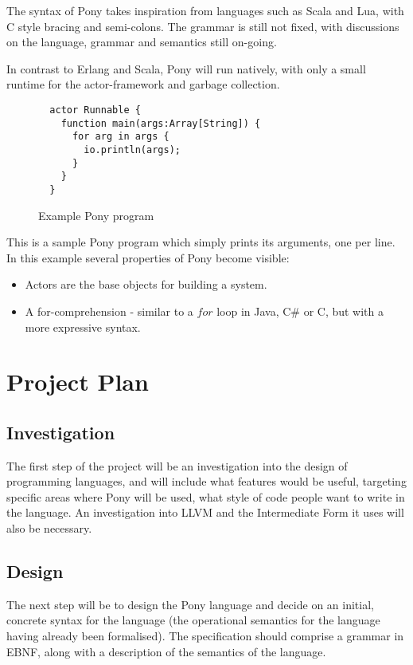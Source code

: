 \documentclass{article}
\begin{document}
The syntax of Pony takes inspiration from languages such as Scala and Lua, with
C style bracing and semi-colons. The grammar is still not fixed, with
discussions on the language, grammar and semantics still on-going.

In contrast to Erlang and Scala, Pony will run natively, with only a small runtime
for the actor-framework and garbage collection.

\begin{figure}[H]
\begin{verbatim}
  actor Runnable {
    function main(args:Array[String]) {
      for arg in args {
      	io.println(args);
      }
    }
  }
\end{verbatim}
\caption{Example Pony program}
\label{fig:simple}
\end{figure}

This is a sample Pony program which simply prints its arguments, one per line.
In this example several properties of Pony become visible:
\begin{itemize}
\item Actors are the base objects for building a system.
\item A for-comprehension - similar to a $for$ loop in Java, C\# or C, but with
      a more expressive syntax.
\end{itemize}

\section{Project Plan}

\subsection{Investigation}
The first step of the project will be an investigation into the design of
programming languages, and will include what features would be useful, targeting
specific areas where Pony will be used, what style of code people want to write
in the language. An investigation into LLVM and the Intermediate Form it uses
will also be necessary.

\subsection{Design}
The next step will be to design the Pony language and decide on an initial,
concrete syntax for the language (the operational semantics for the language
having already been formalised). The specification should comprise a grammar in
EBNF, along with a description of the semantics of the language.
\end{document}
